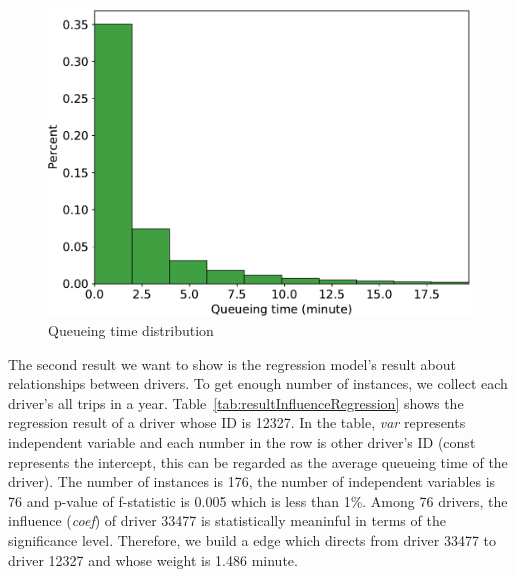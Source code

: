 \documentclass{article}
\begin{document}
\begin{figure} [h]
  \centering
  \includegraphics[width=.9\linewidth]{figs/queueTimeDist}
  \caption{Queueing time distribution}
  \label{fig:queueTimeDist}
\end{figure}


The second result we want to show is the regression model's result about relationships between drivers. To get enough number of instances, we collect each driver's all trips in a year. Table~\ref{tab:resultInfluenceRegression} shows the regression result of a driver whose ID is 12327. In the table, \emph{var} represents independent variable and each number in the row is other driver's ID (const represents the intercept, this can be regarded as the average queueing time of the driver). The number of instances is 176, the number of independent variables is 76 and  p-value of f-statistic is 0.005 which is less than 1\%. Among 76 drivers, the influence (\emph{coef}) of driver 33477 is statistically meaninful in terms of the significance level. Therefore, we build a edge which directs from driver 33477 to driver 12327 and whose weight is 1.486 minute.
\end{document}
